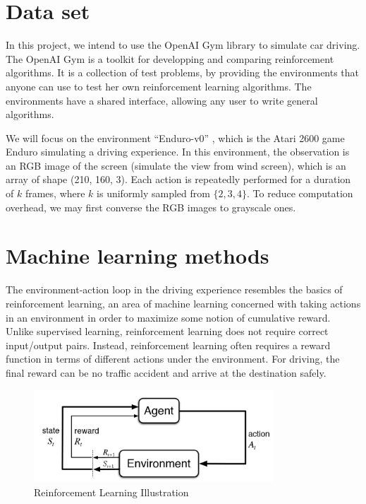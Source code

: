 \documentclass[a4paper]{article}
\begin{document}
\section{Data set}

In this project, we intend to use the OpenAI Gym library to simulate car driving.
The OpenAI Gym \cite{gym} is a toolkit for developping and comparing reinforcement algorithms.
It is a collection of test problems, by providing the environments that anyone can
use to test her own reinforcement learning algorithms. The environments have a shared
interface, allowing any user to write general algorithms.

We will focus on the environment ``Enduro-v0'' \cite{enduro}, which is the Atari 2600 game Enduro
simulating a driving experience. In this environment, the observation is an RGB image
of the screen (simulate the view from wind screen), which is an array of shape (210,
160, 3). Each action is repeatedly performed for a duration of $k$ frames, where $k$
is uniformly sampled from $\{2, 3, 4\}$. To reduce computation overhead, we may first
converse the RGB images to grayscale ones.

\section{Machine learning methods}

The environment-action loop in the driving experience resembles the basics of reinforcement
learning, an area of machine learning concerned with taking actions in an environment in
order to maximize some notion of cumulative reward. Unlike supervised learning, reinforcement
learning does not require correct input/output pairs. Instead, reinforcement learning often
requires a reward function in terms of different actions under the environment. For driving,
the final reward can be no traffic accident and arrive at the destination safely.

\begin{figure}
    \centering
    \includegraphics[width=0.8\textwidth]{./figures/rl.png}
    \caption{ Reinforcement Learning Illustration}
    \label{fig:RL}
\end{figure}
\end{document}

